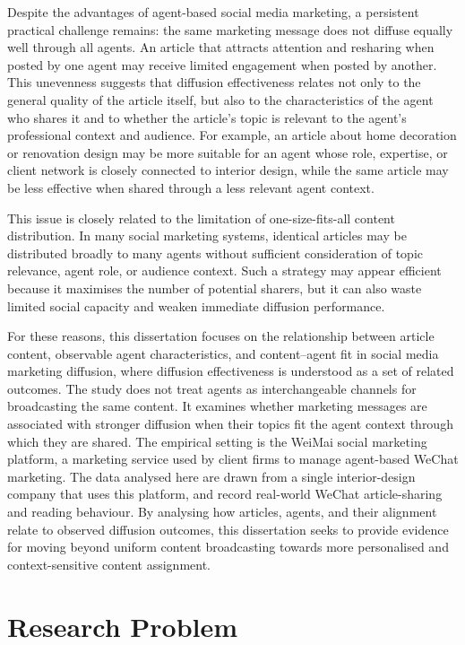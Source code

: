 Despite the advantages of agent-based social media marketing, a persistent practical challenge remains: the same marketing message does not diffuse equally well through all agents. An article that attracts attention and resharing when posted by one agent may receive limited engagement when posted by another. This unevenness suggests that diffusion effectiveness relates not only to the general quality of the article itself, but also to the characteristics of the agent who shares it and to whether the article's topic is relevant to the agent's professional context and audience. For example, an article about home decoration or renovation design may be more suitable for an agent whose role, expertise, or client network is closely connected to interior design, while the same article may be less effective when shared through a less relevant agent context.

This issue is closely related to the limitation of one-size-fits-all content distribution. In many social marketing systems, identical articles may be distributed broadly to many agents without sufficient consideration of topic relevance, agent role, or audience context. Such a strategy may appear efficient because it maximises the number of potential sharers, but it can also waste limited social capacity and weaken immediate diffusion performance.

For these reasons, this dissertation focuses on the relationship between article content, observable agent characteristics, and content–agent fit in social media marketing diffusion, where diffusion effectiveness is understood as a set of related outcomes. The study does not treat agents as interchangeable channels for broadcasting the same content. It examines whether marketing messages are associated with stronger diffusion when their topics fit the agent context through which they are shared. The empirical setting is the WeiMai social marketing platform, a marketing service used by client firms to manage agent-based WeChat marketing. The data analysed here are drawn from a single interior-design company that uses this platform, and record real-world WeChat article-sharing and reading behaviour. By analysing how articles, agents, and their alignment relate to observed diffusion outcomes, this dissertation seeks to provide evidence for moving beyond uniform content broadcasting towards more personalised and context-sensitive content assignment.

\section{Research Problem}
\label{sec:1-2-research-problem}

